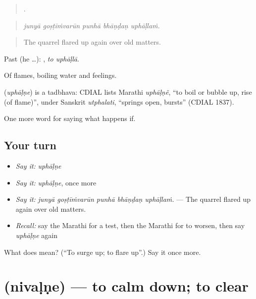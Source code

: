 \begin{quote}
    .
\end{quote}

\begin{quote}
\emph{junyā goṣṭīṁvarūn punhā bhāṇḍaṇ uphāḷlaṁ.}
\end{quote}

\begin{quote}
The quarrel flared up again over old matters.
\end{quote}

Past (he …):  , \emph{to uphāḷlā}.

Of flames, boiling water and feelings.

\begin{cousinweb}
\textbf{} (\emph{uphāḷṇe}) is a tadbhava: CDIAL lists Marathi \emph{uphāḷṇẽ}, \textquotedblleft{}to boil or bubble up, rise (of flame)\textquotedblright{}, under Sanskrit \emph{utphalati}, \textquotedblleft{}springs open, bursts\textquotedblright{} (CDIAL 1837).
\end{cousinweb}

\begin{grammarlens}[title={What you've built}]
One more word for saying what happens if.
\end{grammarlens}

\subsection*{Your turn}
\begin{itemize}
\raggedright
  \item \emph{Say it:} \emph{uphāḷṇe}
  \item \emph{Say it:} \emph{uphāḷṇe}, once more
  \item \emph{Say it:} \emph{junyā goṣṭīṁvarūn punhā bhāṇḍaṇ uphāḷlaṁ.} — The quarrel flared up again over old matters.
  \item \emph{Recall:} say the Marathi for a test, then the Marathi for to worsen, then say \emph{uphāḷṇe} again
\end{itemize}

\begin{tcolorbox}[breakable,colback=teal!4,colframe=teal!35!black,title={Before you move on}]
What does  mean? (\textquotedblleft{}To surge up; to flare up\textquotedblright{}.) Say it once more.
\end{tcolorbox}
\section[\texorpdfstring{\mr{निवळणे} (nivaḷṇe)}{निवळणे (nivaḷṇe)}]{ (nivaḷṇe) — to calm down; to clear}


